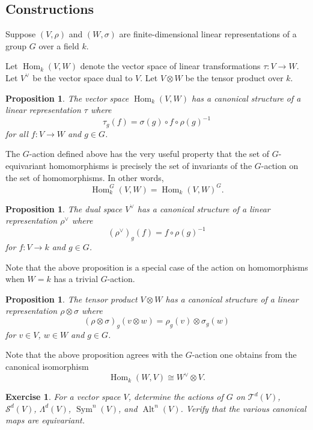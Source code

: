 \documentclass[12pt]{article}
\theoremstyle{plain}
\newtheorem{proposition}[theorem]{Proposition}
\newtheorem{exercise}[theorem]{Exercise}
\theoremstyle{definition}
\theoremstyle{remark}
\numberwithin{equation}{section}
\begin{document}
\subsection{Constructions}

Suppose $(V,\rho)$ and $(W,\sigma)$ are finite-dimensional linear
representations of a group $G$ over a field $k$.

Let $\operatorname{Hom}_k(V,W)$ denote the vector space of linear transformations
$\tau : V \to W$.
Let $V^\vee$ be the vector space dual to $V$.
Let $V \otimes W$ be the tensor product over $k$.

\begin{proposition}
The vector space $\operatorname{Hom}_k(V,W)$ has a canonical structure of a linear
representation $\tau$ where
\[
 \tau_g(f) = \sigma(g) \circ f \circ \rho(g)^{-1}
\]
for all $f : V \to W$ and $g \in G$.
\end{proposition}

The $G$-action defined above has the very useful property that
the set of $G$-equivariant homomorphisms is precisely the set of invariants of the
$G$-action on the set of homomorphisms.  In other words,
\[
\operatorname{Hom}^G_k(V,W) = \operatorname{Hom}_k(V,W)^G .
\]

\begin{proposition}
The dual space $V^\vee$ has a canonical structure of a linear
representation $\rho^\vee$ where
\[
 (\rho^\vee)_g(f) = f \circ \rho(g)^{-1}
\]
for $f : V \to k$ and $g \in G$.
\end{proposition}

Note that the above proposition is a special case of the action on
homomorphisms when $W=k$ has a trivial $G$-action.

\begin{proposition}
The tensor product $V \otimes W$ has a canonical structure of a linear
representation $\rho \otimes \sigma$ where
\[
(\rho \otimes \sigma)_g(v \otimes w) = \rho_g(v) \otimes \sigma_g(w)
\]
for $v \in V$, $w \in W$ and $g \in G$.
\end{proposition}

Note that the above proposition agrees with the $G$-action one
obtains from the canonical isomorphism
\[
\operatorname{Hom}_k(W,V) \cong W^\vee \otimes V. 
\]

\begin{exercise}
For a vector space $V$,
determine the actions of $G$ on
$\mathcal{T}^d(V)$, $\mathcal{S}^d(V)$, $\Lambda^d(V)$,
$\operatorname{Sym}^n(V)$, and $\operatorname{Alt}^n(V)$.
Verify that the various canonical maps are equivariant.
\end{exercise}




\end{document}
